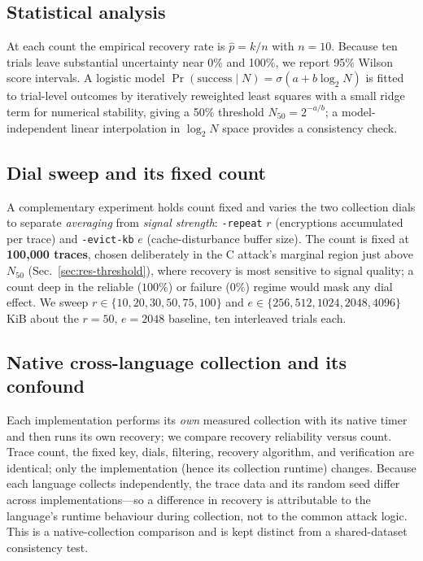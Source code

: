 \documentclass[11pt]{article}
\begin{document}
\subsection{Statistical analysis}
\label{sec:method-stats}
At each count the empirical recovery rate is $\hat p=k/n$ with $n=10$. Because ten
trials leave substantial uncertainty near 0\% and 100\%, we report 95\% Wilson
score intervals. A logistic model $\Pr(\text{success}\mid N)=\sigma(a+b\log_2 N)$
is fitted to trial-level outcomes by iteratively reweighted least squares with a
small ridge term for numerical stability, giving a 50\% threshold
$N_{50}=2^{-a/b}$; a model-independent linear interpolation in $\log_2 N$ space
provides a consistency check.

\subsection{Dial sweep and its fixed count}
\label{sec:method-dial}
A complementary experiment holds count fixed and varies the two collection dials
to separate \emph{averaging} from \emph{signal strength}: \texttt{-repeat} $r$
(encryptions accumulated per trace) and \texttt{-evict-kb} $e$ (cache-disturbance
buffer size). The count is fixed at \textbf{100{,}000 traces}, chosen
deliberately in the C attack's marginal region just above $N_{50}$
(Sec.~\ref{sec:res-threshold}), where recovery is most sensitive to signal
quality; a count deep in the reliable ($100\%$) or failure ($0\%$) regime would
mask any dial effect. We sweep $r\in\{10,20,30,50,75,100\}$ and
$e\in\{256,512,1024,2048,4096\}$\,KiB about the $r{=}50,\,e{=}2048$ baseline, ten
interleaved trials each.

\subsection{Native cross-language collection and its confound}
\label{sec:method-crosslang}
Each implementation performs its \emph{own} measured collection with its native
timer and then runs its own recovery; we compare recovery reliability versus
count. Trace count, the fixed key, dials, filtering, recovery algorithm, and
verification are identical; only the implementation (hence its collection
runtime) changes. Because each language collects independently, the trace data
and its random seed differ across implementations---so a difference in recovery
is attributable to the language's runtime behaviour during collection, not to the
common attack logic. This is a native-collection comparison and is kept distinct
from a shared-dataset consistency test.
\end{document}

